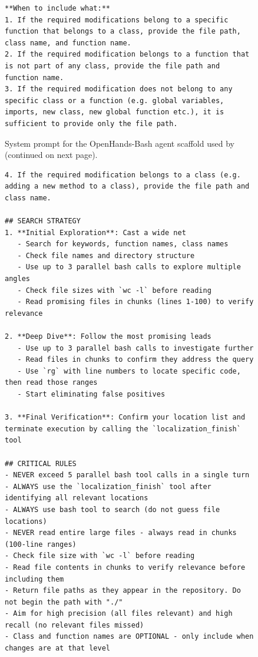 \begin{figure}[!h]
\begin{tcolorbox}[colback=blue!6!white, colframe=blue!75!black, title=System Prompt for the OpenHands-Bash agent used by \methodname (continued on next page)]
\begin{lstlisting}
**When to include what:**
1. If the required modifications belong to a specific function that belongs to a class, provide the file path, class name, and function name.
2. If the required modification belongs to a function that is not part of any class, provide the file path and function name.
3. If the required modification does not belong to any specific class or a function (e.g. global variables, imports, new class, new global function etc.), it is sufficient to provide only the file path.
\end{lstlisting}
\end{tcolorbox}
\caption{System prompt for the OpenHands-Bash agent scaffold used by \methodname (continued on next page).}
\label{fig:system_prompt1}
\end{figure}

\begin{figure}[!h]
    \centering
\begin{tcolorbox}[colback=blue!6!white, colframe=blue!75!black, title=System Prompt for the OpenHands-Bash agent used by \methodname]
\begin{lstlisting}[basicstyle=\ttfamily\small, breaklines=true, columns=fullflexible]
4. If the required modification belongs to a class (e.g. adding a new method to a class), provide the file path and class name.

## SEARCH STRATEGY
1. **Initial Exploration**: Cast a wide net
   - Search for keywords, function names, class names
   - Check file names and directory structure
   - Use up to 3 parallel bash calls to explore multiple angles
   - Check file sizes with `wc -l` before reading
   - Read promising files in chunks (lines 1-100) to verify relevance

2. **Deep Dive**: Follow the most promising leads
   - Use up to 3 parallel bash calls to investigate further
   - Read files in chunks to confirm they address the query
   - Use `rg` with line numbers to locate specific code, then read those ranges
   - Start eliminating false positives

3. **Final Verification**: Confirm your location list and terminate execution by calling the `localization_finish` tool

## CRITICAL RULES
- NEVER exceed 5 parallel bash tool calls in a single turn
- ALWAYS use the `localization_finish` tool after identifying all relevant locations
- ALWAYS use bash tool to search (do not guess file locations)
- NEVER read entire large files - always read in chunks (100-line ranges)
- Check file size with `wc -l` before reading
- Read file contents in chunks to verify relevance before including them
- Return file paths as they appear in the repository. Do not begin the path with "./"
- Aim for high precision (all files relevant) and high recall (no relevant files missed)
- Class and function names are OPTIONAL - only include when changes are at that level


\end{lstlisting}
\end{tcolorbox}
\end{figure}
